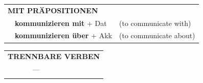 \documentclass[10pt,a4paper]{revtex4-2}
\begin{document}
\begin{verbbox}
\vspace{10pt}

\begin{tabular}{lll}
\multicolumn{3}{l}{\textbf{MIT PRÄPOSITIONEN}}\\
& \textbf{kommunizieren mit} + Dat & (to communicate with)\\
& \textbf{kommunizieren über} + Akk & (to communicate about)\\
\end{tabular}
\hfill
\begin{tabular}{lll}
\multicolumn{3}{l}{\textbf{TRENNBARE VERBEN}}\\
& ---\\
\vspace{10pt}
\end{tabular}

\vspace{-5pt}
\end{verbbox}
\end{document}
